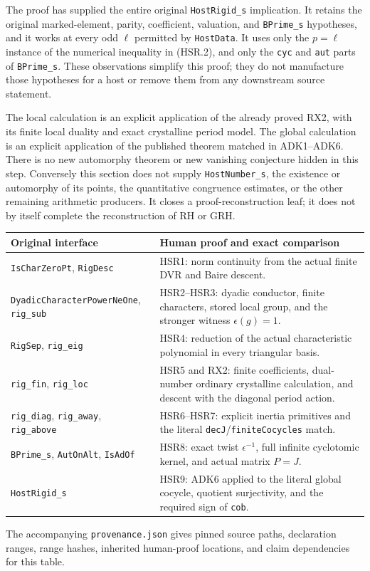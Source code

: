 The proof has supplied the entire original
\texttt{HostRigid\_s} implication.  It retains the original
marked-element, parity, coefficient, valuation, and
\texttt{BPrime\_s} hypotheses, and it works at every odd
$\ell$ permitted by \texttt{HostData}.  It uses only the
$p=\ell$ instance of the numerical inequality in (HSR.2), and
only the \texttt{cyc} and \texttt{aut} parts of
\texttt{BPrime\_s}.  These observations simplify this proof;
they do not manufacture those hypotheses for a host or remove
them from any downstream source statement.

The local calculation is an explicit application of the already
proved RX2, with its finite local duality and exact crystalline
period model.  The global calculation is an explicit application
of the published theorem matched in ADK1--ADK6.  There is no new
automorphy theorem or new vanishing conjecture hidden in this
step.  Conversely this section does not supply
\texttt{HostNumber\_s}, the existence or automorphy of its points,
the quantitative congruence estimates, or the other remaining
arithmetic producers.  It closes a proof-reconstruction leaf;
it does not by itself complete the reconstruction of RH or GRH.

\begin{center}
\begin{tabular}{p{}p{}}
Original interface & Human proof and exact comparison \\
\hline
\texttt{IsCharZeroPt}, \texttt{RigDesc}
 & HSR1: norm continuity from the actual finite DVR and Baire descent.\\
\texttt{DyadicCharacterPowerNeOne}, \texttt{rig\_sub}
 & HSR2--HSR3: dyadic conductor, finite characters, stored local group,
   and the stronger witness $\epsilon(g)=1$.\\
\texttt{RigSep}, \texttt{rig\_eig}
 & HSR4: reduction of the actual characteristic polynomial in every
   triangular basis.\\
\texttt{rig\_fin}, \texttt{rig\_loc}
 & HSR5 and RX2: finite coefficients, dual-number ordinary
   crystalline calculation, and descent with the diagonal period action.\\
\texttt{rig\_diag}, \texttt{rig\_away}, \texttt{rig\_above}
 & HSR6--HSR7: explicit inertia primitives and the literal
   \texttt{decJ}/\texttt{finiteCocycles} match.\\
\texttt{BPrime\_s}, \texttt{AutOnAlt}, \texttt{IsAdOf}
 & HSR8: exact twist $\epsilon^{-1}$, full infinite cyclotomic
   kernel, and actual matrix $P=J$.\\
\texttt{HostRigid\_s}
 & HSR9: ADK6 applied to the literal global cocycle, quotient
   surjectivity, and the required sign of \texttt{cob}.\\
\end{tabular}
\end{center}

The accompanying \texttt{provenance.json} gives pinned source
paths, declaration ranges, range hashes, inherited human-proof
locations, and claim dependencies for this table.
